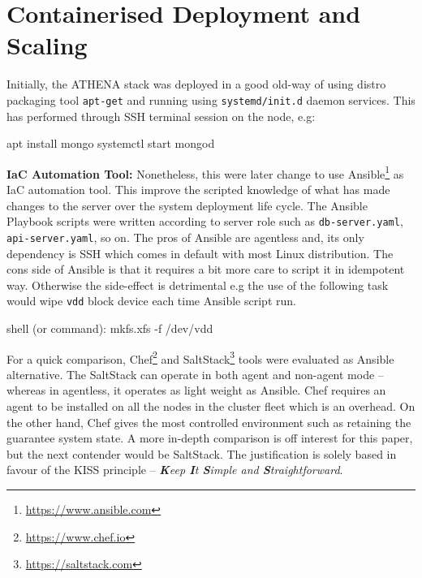 \section{Containerised Deployment and Scaling}

Initially, the ATHENA stack was deployed in a good old-way of using distro packaging tool \verb|apt-get| and running using \verb|systemd/init.d| daemon services. This has performed through SSH terminal session on the node, e.g:

\begin{small}
\begin{lcverbatim}
apt install mongo
systemctl start mongod
\end{lcverbatim}
\end{small}

\noindent \textbf{IaC Automation Tool:} \quad Nonetheless, this were later change to use Ansible\footnote{\url{https://www.ansible.com}} as IaC automation tool. This improve the scripted knowledge of what has made changes to the server over the system deployment life cycle. The Ansible Playbook scripts were written according to server role such as \verb|db-server.yaml|, \verb|api-server.yaml|, so on. The pros of Ansible are agentless and, its only dependency is SSH which comes in default with most Linux distribution. The cons side of Ansible is that it requires a bit more care to script it in idempotent way. Otherwise the side-effect is detrimental e.g the use of the following task would wipe \verb|vdd| block device each time Ansible script run.

\begin{small}
\begin{lcverbatim}
shell (or command): mkfs.xfs -f /dev/vdd
\end{lcverbatim}
\end{small}
 
For a quick comparison, Chef\footnote{\url{https://www.chef.io}} and SaltStack\footnote{\url{https://saltstack.com}} tools were evaluated as Ansible alternative. The SaltStack can operate in both agent and non-agent mode -- whereas in agentless, it operates as light weight as Ansible. Chef requires an agent to be installed on all the nodes in the cluster fleet which is an overhead. On the other hand, Chef gives the most controlled environment such as retaining the guarantee system state. A more in-depth comparison is off interest for this paper, but the next contender would be SaltStack. The justification is solely based in favour of the KISS principle -- \textit{\textbf{K}eep \textbf{I}t \textbf{S}imple and \textbf{S}traightforward}.

